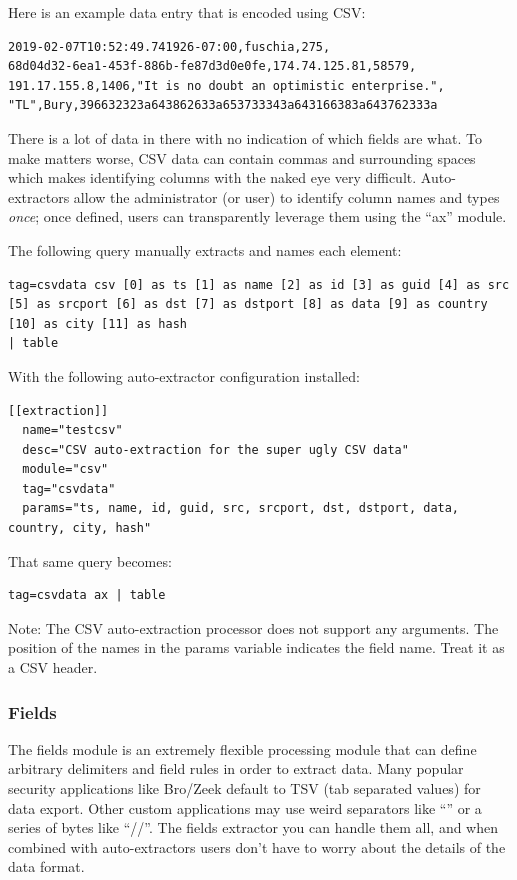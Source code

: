 Here is an example data entry that is encoded using CSV:

\begin{Verbatim}[breaklines=true]
2019-02-07T10:52:49.741926-07:00,fuschia,275,
68d04d32-6ea1-453f-886b-fe87d3d0e0fe,174.74.125.81,58579,
191.17.155.8,1406,"It is no doubt an optimistic enterprise.",
"TL",Bury,396632323a643862633a653733343a643166383a643762333a
\end{Verbatim}

There is a lot of data in there with no indication of which fields are
what. To make matters worse, CSV data can contain commas and surrounding
spaces which makes identifying columns with the naked eye very
difficult. Auto-extractors allow the administrator (or user) to identify column
names and types \emph{once}; once defined, users can transparently leverage
them using the ``ax'' module.

The following query manually extracts and names each element:

\begin{Verbatim}[breaklines=true]
tag=csvdata csv [0] as ts [1] as name [2] as id [3] as guid [4] as src 
[5] as srcport [6] as dst [7] as dstport [8] as data [9] as country 
[10] as city [11] as hash
| table
\end{Verbatim}

With the following auto-extractor configuration installed:

\begin{Verbatim}[breaklines=true]
[[extraction]]
  name="testcsv"
  desc="CSV auto-extraction for the super ugly CSV data"
  module="csv"
  tag="csvdata"
  params="ts, name, id, guid, src, srcport, dst, dstport, data, country, city, hash"
\end{Verbatim}

That same query becomes:

\begin{Verbatim}[breaklines=true]
tag=csvdata ax | table
\end{Verbatim}

Note: The CSV auto-extraction processor does not support any
arguments. The position of the names in the params variable indicates
the field name. Treat it as a CSV header.

\subsubsection{Fields}

The fields module is an extremely flexible processing module that can
define arbitrary delimiters and field rules in order to extract data.
Many popular security applications like Bro/Zeek default to TSV (tab
separated values) for data export. Other custom applications may use
weird separators like ``\textbar{}'' or a series of bytes like ``//''. The
fields extractor you can handle them all, and when combined with
auto-extractors users don't have to worry about the details of the data
format.

